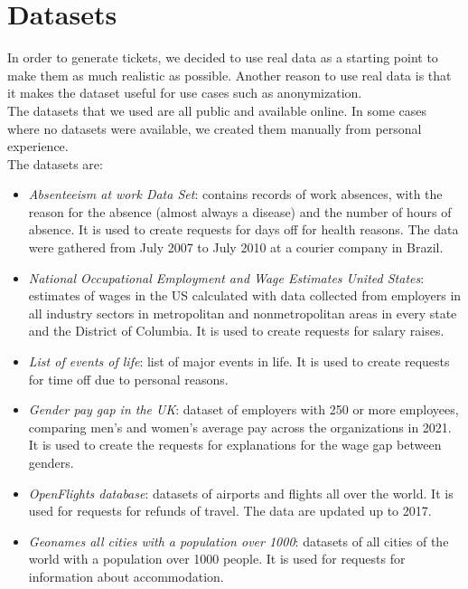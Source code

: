 \section{Datasets}
\label{sec:datasets}

In order to generate tickets, we decided to use real data as a starting point to make them as much realistic as possible. Another reason to use real data is that it makes the dataset useful for use cases such as anonymization. \\
The datasets that we used are all public and available online. In some cases where no datasets were available, we created them manually from personal experience. \\
The datasets are:
\begin{itemize}
    \item \textit{Absenteeism at work Data Set}: contains records of work absences, with the reason for the absence (almost always a disease) and the number of hours of absence. It is used to create requests for days off for health reasons. The data were gathered from July 2007 to July 2010 at a courier company in Brazil.
    \item \textit{National Occupational Employment and Wage Estimates United States}: estimates of wages in the US calculated with data collected from employers in all industry sectors in metropolitan and nonmetropolitan areas in every state and the District of Columbia. It is used to create requests for salary raises.
    \item \textit{List of events of life}: list of major events in life. It is used to create requests for time off due to personal reasons. 
    \item \textit{Gender pay gap in the UK}: dataset of employers with 250 or more employees, comparing men's and women's average pay across the organizations in 2021. It is used to create the requests for explanations for the wage gap between genders.
    \item \textit{OpenFlights database}: datasets of airports and flights all over the world. It is used for requests for refunds of travel. The data are updated up to 2017.
    \item \textit{Geonames all cities with a population over 1000}: datasets of all cities of the world with a population over 1000 people. It is used for requests for information about accommodation.
\end{itemize}